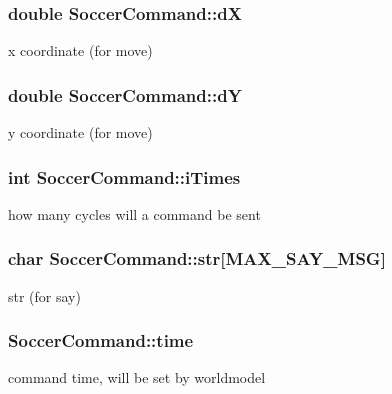 \subsubsection[{\texorpdfstring{dX}{dX}}]{\setlength{\rightskip}{0pt plus 5cm}double Soccer\+Command\+::dX}\hypertarget{classSoccerCommand_a91dc3c7136ee949d769371593cd1c280}{}\label{classSoccerCommand_a91dc3c7136ee949d769371593cd1c280}
x coordinate (for move) 
\subsubsection[{\texorpdfstring{dY}{dY}}]{\setlength{\rightskip}{0pt plus 5cm}double Soccer\+Command\+::dY}\hypertarget{classSoccerCommand_acf593fd8e092f9352a0367f9aa5e1a40}{}\label{classSoccerCommand_acf593fd8e092f9352a0367f9aa5e1a40}
y coordinate (for move) 
\subsubsection[{\texorpdfstring{i\+Times}{iTimes}}]{\setlength{\rightskip}{0pt plus 5cm}int Soccer\+Command\+::i\+Times}\hypertarget{classSoccerCommand_aa675c370ba898ae373c0e45f400f3137}{}\label{classSoccerCommand_aa675c370ba898ae373c0e45f400f3137}
how many cycles will a command be sent 
\subsubsection[{\texorpdfstring{str}{str}}]{\setlength{\rightskip}{0pt plus 5cm}char Soccer\+Command\+::str\mbox{[}{\bf M\+A\+X\+\_\+\+S\+A\+Y\+\_\+\+M\+SG}\mbox{]}}\hypertarget{classSoccerCommand_a0bdfba0e05fdd6a179c6ebeb5bd5c954}{}\label{classSoccerCommand_a0bdfba0e05fdd6a179c6ebeb5bd5c954}
str (for say) 
\subsubsection[{\texorpdfstring{time}{time}}]{ Soccer\+Command\+::time}\hypertarget{classSoccerCommand_a5ce253af032683290460f177259912a6}{}\label{classSoccerCommand_a5ce253af032683290460f177259912a6}
command time, will be set by worldmodel 
